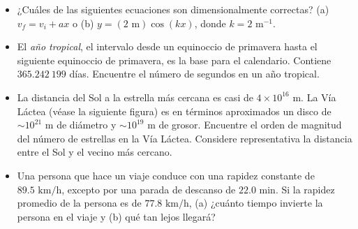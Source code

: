 \documentclass[11pt,a4paper]{article}
\begin{document}
\begin{itemize}
    \item[\textbf{1.}] ¿Cuáles de las siguientes ecuaciones son dimensionalmente correctas? (a) $v_f = v_i + ax$ o (b) $y = (2 \text{ m}) \cos(kx)$, donde $k = 2 \text{ m}^{-1}$.
    \vspace*{6cm}

    \item[\textbf{2.}] El \textit{año tropical}, el intervalo desde un equinoccio de primavera hasta el siguiente equinoccio de primavera, es la base para el calendario. Contiene $365.242\ 199$ días. Encuentre el número de segundos en un año tropical.
    \vspace*{6cm}

    \item[\textbf{3.}] La distancia del Sol a la estrella más cercana es casi de $4 \times 10^{16} \text{ m}$. La Vía Láctea (véase la siguiente figura) es en términos aproximados un disco de $\sim 10^{21} \text{ m}$ de diámetro y $\sim 10^{19} \text{ m}$ de grosor. Encuentre el orden de magnitud del número de estrellas en la Vía Láctea. Considere representativa la distancia entre el Sol y el vecino más cercano.
    \vspace*{6cm}

    \item[\textbf{4.}] Una persona que hace un viaje conduce con una rapidez constante de $89.5 \text{ km/h}$, excepto por una parada de descanso de $22.0 \text{ min}$. Si la rapidez promedio de la persona es de $77.8 \text{ km/h}$, (a) ¿cuánto tiempo invierte la persona en el viaje y (b) qué tan lejos llegará?
    \vspace*{6cm}
\end{itemize}

\newpage
\end{document}
